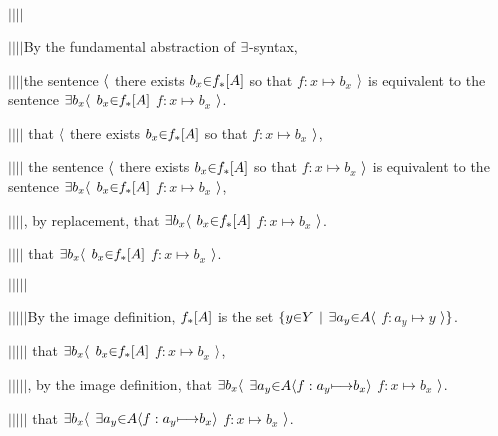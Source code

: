 $|$\hs$|$\hs$|$\hs$|$\hs \par
$|$\hs$|$\hs$|$\hs$|$\hs By the fundamental abstraction of $\a\exists$-syntax, \par
$|$\hs$|$\hs$|$\hs$|$\hs the sentence $\a\langle$ there exists $b_x \p\in f_*[\g A]$ so that $f: x \mapsto b_x$ $\a\rangle$ is equivalent to the sentence $\a\exists b_x \a\langle$ $b_x \p\in f_*[\g A]$  $f: x \mapsto b_x$ $\a\rangle$. \par
$|$\hs$|$\hs$|$\hs$|$\hs {}  that $\a\langle$ there exists $b_x \p\in f_*[\g A]$ so that $f: x \mapsto b_x$ $\a\rangle$, \par
$|$\hs$|$\hs$|$\hs$|$\hs {} the sentence $\a\langle$ there exists $b_x \p\in f_*[\g A]$ so that $f: x \mapsto b_x$ $\a\rangle$ is equivalent to the sentence $\a\exists b_x \a\langle$ $b_x \p\in f_*[\g A]$  $f: x \mapsto b_x$ $\a\rangle$, \par
$|$\hs$|$\hs$|$\hs$|$\hs {}, by replacement,  that $\a\exists b_x \a\langle$ $b_x \p\in f_*[\g A]$  $f: x \mapsto b_x$ $\a\rangle$. \par
$|$\hs$|$\hs$|$\hs$|$\hs {} that $\a\exists b_x \a\langle$ $b_x \p\in f_*[\g A]$  $f: x \mapsto b_x$ $\a\rangle$. \par

$|$\hs$|$\hs$|$\hs$|$\hs$|$\hs \par
$|$\hs$|$\hs$|$\hs$|$\hs$|$\hs By the image definition, $f_*[\g A]$ is the set $\a\{y \p\in Y \pipe \a\exists a_y \p\in \g A \a\langle$ $f: a_y \mapsto y$ $\a\rangle \a\}$. \par
$|$\hs$|$\hs$|$\hs$|$\hs$|$\hs {}  that $\a\exists b_x \a\langle$ $b_x \p\in f_*[\g A]$  $f: x \mapsto b_x$ $\a\rangle$, \par
$|$\hs$|$\hs$|$\hs$|$\hs$|$\hs {}, by the image definition,  that $\a\exists b_x \a\langle$ $\a\exists a_y \p\in A \a\langle f: a_y \mapsto b_x \a\rangle$  $f: x \mapsto b_x$ $\a\rangle$. \par
$|$\hs$|$\hs$|$\hs$|$\hs$|$\hs {} that $\a\exists b_x \a\langle$ $\a\exists a_y \p\in A \a\langle f: a_y \mapsto b_x \a\rangle$  $f: x \mapsto b_x$ $\a\rangle$. \par

